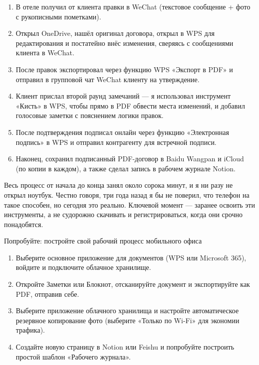 \begin{enumerate}
  \item В отеле получил от клиента правки в WeChat (текстовое сообщение + фото с рукописными пометками).
  \item Открыл OneDrive, нашёл оригинал договора, открыл в WPS для редактирования и постатейно внёс изменения, сверяясь с сообщениями клиента в WeChat.
  \item После правок экспортировал через функцию WPS «Экспорт в PDF» и отправил в групповой чат WeChat клиенту на утверждение.
  \item Клиент прислал второй раунд замечаний — я использовал инструмент «Кисть» в WPS, чтобы прямо в PDF обвести места изменений, и добавил голосовые заметки с пояснением логики правок.
  \item После подтверждения подписал онлайн через функцию «Электронная подпись» в WPS и отправил контрагенту для встречной подписи.
  \item Наконец, сохранил подписанный PDF-договор в Baidu Wangpan и iCloud (по копии в каждом), а также сделал запись в рабочем журнале Notion.
\end{enumerate}

Весь процесс от начала до конца занял около сорока минут, и я ни разу не открыл ноутбук. Честно говоря, три года назад я бы не поверил, что телефон на такое способен, но сегодня это реально. Ключевой момент — заранее освоить эти инструменты, а не судорожно скачивать и регистрироваться, когда они срочно понадобятся.

\begin{tcbpractice}{Попробуйте: постройте свой рабочий процесс мобильного офиса}
\begin{enumerate}
  \item Выберите основное приложение для документов (WPS или Microsoft 365), войдите и подключите облачное хранилище.
  \item Откройте Заметки или Блокнот, отсканируйте документ и экспортируйте как PDF, отправив себе.
  \item Выберите приложение облачного хранилища и настройте автоматическое резервное копирование фото (выберите «Только по Wi-Fi» для экономии трафика).
  \item Создайте новую страницу в Notion или Feishu и попробуйте построить простой шаблон «Рабочего журнала».
\end{enumerate}

\end{tcbpractice}
